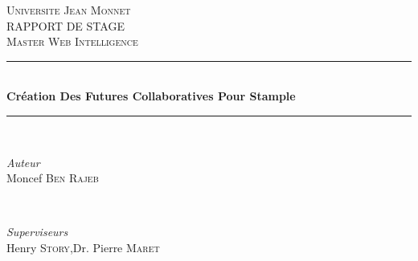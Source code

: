 \documentclass[12pt]{article}
\begin{document}
\begin{titlepage}

\newcommand{\HRule}{\rule{\linewidth}{0.9mm}} %

\center %
 


\textsc{\LARGE Universite Jean Monnet}\\[1.5cm] %
\textsc{\Large RAPPORT DE STAGE}\\[0.5cm] %
\textsc{\large Master Web Intelligence}\\[0.5cm] %


\HRule \\[1.2cm]
{ \huge \bfseries Cr\'eation Des Futures Collaboratives Pour Stample}\\[1.6cm] %
\HRule \\[3cm]
 

\begin{minipage}{0.45\textwidth}
\begin{flushleft} \large
\emph{Auteur}\\
Moncef \textsc{Ben Rajeb} %
\end{flushleft}
\end{minipage}
~
\begin{minipage}{0.45\textwidth}
\begin{flushleft} \large
\emph{Superviseurs} \\
Henry \textsc{Story},\newline Dr. Pierre \textsc{Maret} %


\end{flushleft}
\end{minipage}
\end{titlepage}
\end{document}
